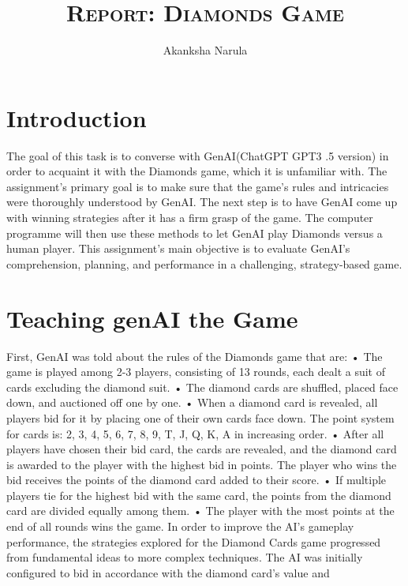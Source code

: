 \documentclass[letterpaper,12pt]{article}
\begin{document}
\title{\textbf{\Huge \scshape Report: Diamonds Game}}
\author{Akanksha Narula}
\date{}
\maketitle
\section{Introduction}
The goal of this task is to converse with GenAI(ChatGPT GPT3 .5 version) in order to acquaint it with the Diamonds game, which it is unfamiliar with. The assignment's primary goal is to make sure that
the game's rules and intricacies were thoroughly understood by GenAI. The next step is to have GenAI come up with winning strategies after it has a firm grasp of the game. The computer programme will then use these methods to let GenAI play Diamonds versus a human player. This assignment's main objective is to evaluate GenAI's comprehension, planning, and performance in a challenging, strategy-based game.




\section{Teaching genAI the Game}
First, GenAI was told about the rules of the Diamonds game that are:\newline
• The game is played among 2-3 players, consisting of 13 rounds, each dealt a suit of cards excluding the diamond
suit. \newline
• The diamond cards are shuffled, placed face down, and auctioned off one by one. \newline
• When a diamond card is revealed, all players bid for it by placing one of their own cards face down. The point
system for cards is: 2, 3, 4, 5, 6, 7, 8, 9, T, J, Q, K, A in increasing order.\newline
• After all players have chosen their bid card, the cards are revealed, and the diamond card is awarded to the player
with the highest bid in points. The player who wins the bid receives the points of the diamond card added to their
score.\newline
• If multiple players tie for the highest bid with the same card, the points from the diamond card are divided equally
among them.\newline
• The player with the most points at the end of all rounds wins the game.\newline
\newline
In order to improve the AI's gameplay performance, the strategies explored for the Diamond Cards game progressed from fundamental ideas to more complex techniques. The AI was initially configured to bid in accordance with the diamond card's value and
\end{document}
